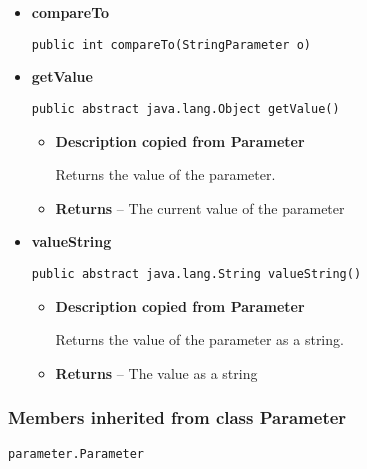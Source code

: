 {{{{{{{{{{{{{{{{{{\begin{itemize}
{\begin{itemize}
{Let the visitor visit this parameter.
}
\item{
{\bf  Parameters}
  \begin{itemize}
   \item{
\texttt{visitor} -- The visitor to visit}
  \end{itemize}
}%
\end{itemize}
}%
\item{ 
{\bf  compareTo}\\
\begin{lstlisting}[frame=none]
public int compareTo(StringParameter o)\end{lstlisting} %
}%
\item{ 
{\bf  getValue}\\
\begin{lstlisting}[frame=none]
public abstract java.lang.Object getValue()\end{lstlisting} %
\begin{itemize}
\item{
{\bf  Description copied from Parameter{\small {}} }

Returns the value of the parameter.
}
\item{{\bf  Returns} -- 
The current value of the parameter 
}%
\end{itemize}
}%
\item{ 
{\bf  valueString}\\
\begin{lstlisting}[frame=none]
public abstract java.lang.String valueString()\end{lstlisting} %
\begin{itemize}
\item{
{\bf  Description copied from Parameter{\small {}} }

Returns the value of the parameter as a string.
}
\item{{\bf  Returns} -- 
The value as a string 
}%
\end{itemize}
}%
\end{itemize}
}
\subsubsection{Members inherited from class Parameter }{
\texttt{parameter.Parameter} {\small 
{}}
{\small 

}}}}}}}}}}}}}}}}}}}
